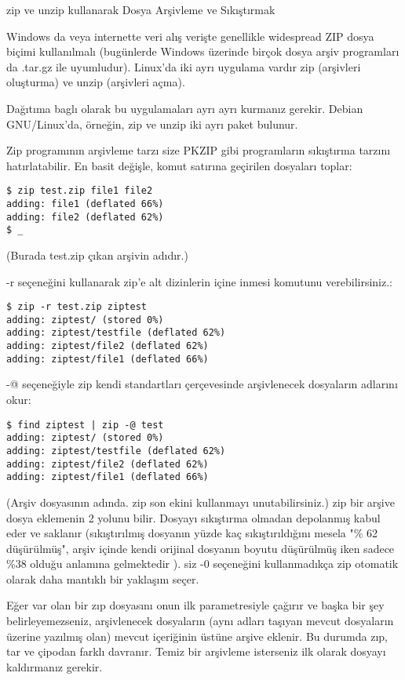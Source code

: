 \begin{section}{zip ve unzip kullanarak Dosya Arşivleme ve Sıkıştırmak}

Windows da veya internette veri alış verişte genellikle widespread ZIP dosya biçimi kullanılmalı (bugünlerde Windows üzerinde birçok dosya arşiv programları da .tar.gz ile uyumludur). Linux'da iki ayrı uygulama vardır zip (arşivleri oluşturma) ve unzip (arşivleri açma).

Dağıtıma baglı olarak bu uygulamaları ayrı ayrı kurmanız gerekir. Debian GNU/Linux'da, örneğin, zip ve unzip iki ayrı paket bulunur.

Zip programının arşivleme tarzı size PKZIP gibi programların sıkıştırma tarzını hatırlatabilir. En basit değişle, komut satırına geçirilen dosyaları toplar:
\begin{verbatim}
$ zip test.zip file1 file2
adding: file1 (deflated 66%)
adding: file2 (deflated 62%)
$ _
\end{verbatim}

(Burada test.zip çıkan arşivin adıdır.)

-r seçeneğini kullanarak zip'e alt dizinlerin içine inmesi komutunu verebilirsiniz.:
\begin{verbatim}
$ zip -r test.zip ziptest
adding: ziptest/ (stored 0%)
adding: ziptest/testfile (deflated 62%)
adding: ziptest/file2 (deflated 62%)
adding: ziptest/file1 (deflated 66%)
\end{verbatim}

-@ seçeneğiyle zip kendi standartları çerçevesinde arşivlenecek dosyaların adlarını okur:
\begin{verbatim}
$ find ziptest | zip -@ test
adding: ziptest/ (stored 0%)
adding: ziptest/testfile (deflated 62%)
adding: ziptest/file2 (deflated 62%)
adding: ziptest/file1 (deflated 66%)
\end{verbatim}

(Arşiv dosyasının adında. zip son ekini kullanmayı unutabilirsiniz.)
zip bir arşive dosya eklemenin 2 yolunu bilir. Dosyayı sıkıştırma olmadan depolanmış kabul eder ve saklanır (sıkıştırılmış dosyanın yüzde kaç sıkıştırıldığını mesela "\% 62 düşürülmüş", arşiv içinde kendi orijinal dosyanın boyutu düşürülmüş iken sadece \%38 olduğu anlamına gelmektedir ). siz -0 seçeneğini kullanmadıkça zip otomatik olarak daha mantıklı bir yaklaşım seçer.

Eğer var olan bir zıp dosyasını onun ilk parametresiyle çağırır ve başka bir şey belirleyemezseniz, arşivlenecek dosyaların (aynı adları taşıyan mevcut dosyaların üzerine yazılmış olan) mevcut içeriğinin üstüne arşive eklenir. Bu durumda zıp, tar ve çipodan farklı davranır. Temiz bir arşivleme isterseniz ilk olarak dosyayı kaldırmanız gerekir.


\end{section}

